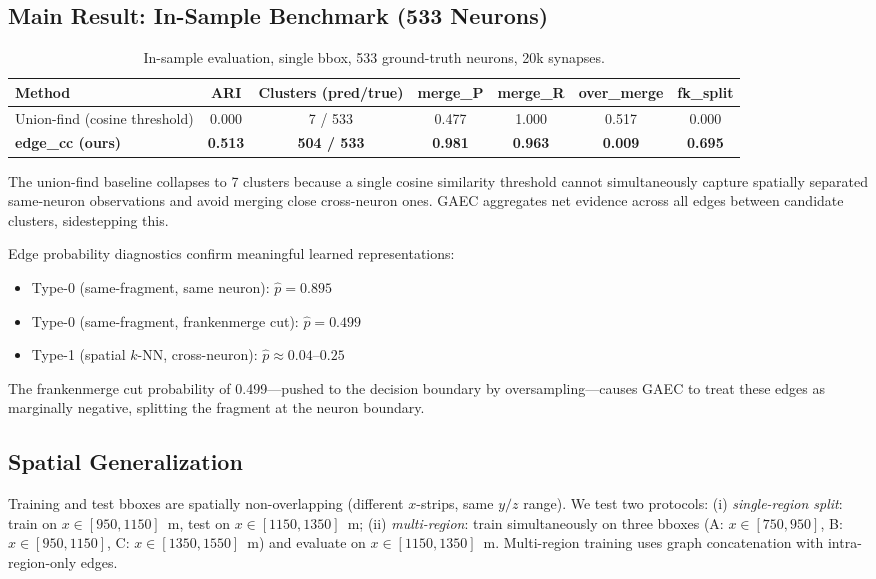 \documentclass[10pt,letterpaper]{article}
\begin{document}
\subsection{Main Result: In-Sample Benchmark (533 Neurons)}

\begin{table}[h]
\centering
\caption{In-sample evaluation, single bbox, 533 ground-truth neurons, 20k synapses.}
\label{tab:insample}
\small
\begin{tabular}{lcccccc}
\toprule
Method & ARI & Clusters (pred/true) & merge\_P & merge\_R & over\_merge & fk\_split \\
\midrule
Union-find (cosine threshold) & 0.000 & 7 / 533 & 0.477 & 1.000 & 0.517 & 0.000 \\
\textbf{edge\_cc (ours)}      & \textbf{0.513} & \textbf{504 / 533} & \textbf{0.981} & \textbf{0.963} & \textbf{0.009} & \textbf{0.695} \\
\bottomrule
\end{tabular}
\end{table}

The union-find baseline collapses to 7 clusters because a single cosine similarity
threshold cannot simultaneously capture spatially separated same-neuron observations and
avoid merging close cross-neuron ones. GAEC aggregates net evidence across all edges
between candidate clusters, sidestepping this.

Edge probability diagnostics confirm meaningful learned representations:
\begin{itemize}
\item Type-0 (same-fragment, same neuron): $\hat{p} = 0.895$
\item Type-0 (same-fragment, frankenmerge cut): $\hat{p} = 0.499$
\item Type-1 (spatial $k$-NN, cross-neuron): $\hat{p} \approx 0.04$--$0.25$
\end{itemize}
The frankenmerge cut probability of 0.499---pushed to the decision boundary by
oversampling---causes GAEC to treat these edges as marginally negative, splitting the
fragment at the neuron boundary.

\subsection{Spatial Generalization}
\label{sec:spatial}

Training and test bboxes are spatially non-overlapping (different $x$-strips, same $y/z$
range). We test two protocols: (i) \emph{single-region split}: train on
$x \in [950, 1150]$~\textmu{}m, test on $x \in [1150, 1350]$~\textmu{}m; (ii)
\emph{multi-region}: train simultaneously on three bboxes
(A: $x \in [750, 950]$, B: $x \in [950, 1150]$, C: $x \in [1350, 1550]$~\textmu{}m)
and evaluate on $x \in [1150, 1350]$~\textmu{}m. Multi-region training uses graph
concatenation with intra-region-only edges.
\end{document}
